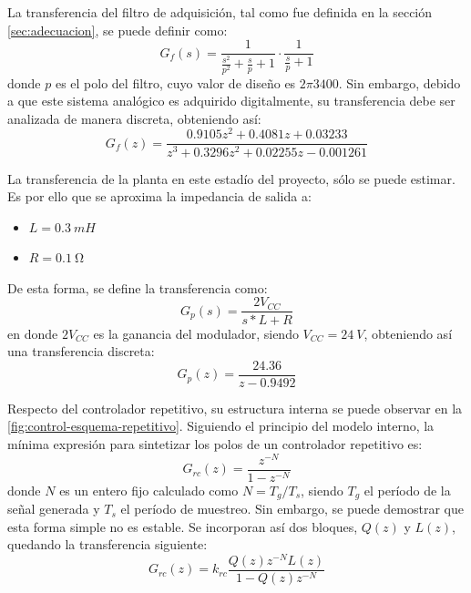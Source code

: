 \documentclass[../et.tex]{subfiles}
\begin{document}
La transferencia del filtro de adquisición, tal como fue definida en la sección \ref{sec:adecuacion}, se puede definir como:
\[
    G_f(s) = \frac{1}{\frac{s^2}{p^2} + \frac{s}{p} + 1} \cdot \frac{1}{\frac{s}{p} + 1}
\]
donde $p$ es el polo del filtro, cuyo valor de diseño es $2\pi 3400$. Sin embargo, debido a que este sistema analógico es adquirido digitalmente, su transferencia debe ser analizada de manera discreta, obteniendo así:
\[
    G_f(z) = \frac{0.9105z^2 + 0.4081z + 0.03233}{z^3 + 0.3296z^2 + 0.02255z - 0.001261}
\]

La transferencia de la planta en este estadío del proyecto, sólo se puede estimar. Es por ello que se aproxima la impedancia de salida a:
    \begin{itemize}
        \item $L = \SI{0.3}{mH}$
        \item $R = \SI{0.1}{\ohm}$
    \end{itemize}
De esta forma, se define la transferencia como:
\[
    G_p(s) = \frac{2V_{CC}}{s*L + R}
\]
en donde $2V_{CC}$ es la ganancia del modulador, siendo $V_{CC} = \SI{24}{V}$, obteniendo así una transferencia discreta:
\[
    G_p(z) = \frac{24.36}{z - 0.9492}
\]

Respecto del controlador repetitivo, su estructura interna se puede observar en la \autoref{fig:control-esquema-repetitivo}. Siguiendo el principio del modelo interno, la mínima expresión para sintetizar los polos de un controlador repetitivo es:
\[
    G_{rc}(z) = \frac{z^{-N}}{1-z^{-N}}
\]
donde $N$ es un entero fijo calculado como $N = T_g/T_s$, siendo $T_g$ el período de la señal generada y $T_s$ el período de muestreo. Sin embargo, se puede demostrar que esta forma simple no es estable. Se incorporan así dos bloques, $Q(z)$ y $L(z)$, quedando la transferencia siguiente:
\[
    G_{rc}(z) = k_{rc} \frac{Q(z) z^{-N} L(z)}{1-Q(z) z^{-N}}
\]
\end{document}
